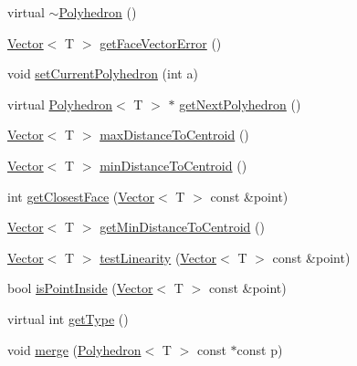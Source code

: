 \begin{DoxyCompactItemize}
\item 
virtual \hyperlink{classccmc_1_1_polyhedron_a0d70cc8f2c26b2fcc6589b66f00e3ab1}{$\sim$\-Polyhedron} ()
\item 
\hyperlink{classccmc_1_1_vector}{Vector}$<$ T $>$ \hyperlink{classccmc_1_1_polyhedron_a2c7464ff7c021b3b7aafaf3739217110}{get\-Face\-Vector\-Error} ()
\item 
void \hyperlink{classccmc_1_1_polyhedron_a140b9776d318b32baeb43f807f8b6791}{set\-Current\-Polyhedron} (int a)
\item 
virtual \hyperlink{classccmc_1_1_polyhedron}{Polyhedron}$<$ T $>$ $\ast$ \hyperlink{classccmc_1_1_polyhedron_a3a3d6e72e95b7e7829149f3fa59f57f6}{get\-Next\-Polyhedron} ()
\item 
\hyperlink{classccmc_1_1_vector}{Vector}$<$ T $>$ \hyperlink{classccmc_1_1_polyhedron_ac7c3d855a8df0072cc23c88a42f8bd78}{max\-Distance\-To\-Centroid} ()
\item 
\hyperlink{classccmc_1_1_vector}{Vector}$<$ T $>$ \hyperlink{classccmc_1_1_polyhedron_ac6c4696d8599d39da7dca7ecb6008ba7}{min\-Distance\-To\-Centroid} ()
\item 
int \hyperlink{classccmc_1_1_polyhedron_afd4793a541b3638e10ad230b9edc101c}{get\-Closest\-Face} (\hyperlink{classccmc_1_1_vector}{Vector}$<$ T $>$ const \&point)
\item 
\hyperlink{classccmc_1_1_vector}{Vector}$<$ T $>$ \hyperlink{classccmc_1_1_polyhedron_ab68fb11d2cbbd0a9bc81ce4c4a7279b1}{get\-Min\-Distance\-To\-Centroid} ()
\item 
\hyperlink{classccmc_1_1_vector}{Vector}$<$ T $>$ \hyperlink{classccmc_1_1_polyhedron_a4630616f4eb7d32a53e1a23a332db78c}{test\-Linearity} (\hyperlink{classccmc_1_1_vector}{Vector}$<$ T $>$ const \&point)
\item 
bool \hyperlink{classccmc_1_1_polyhedron_ab49d000c95f4e79132727103524ca45b}{is\-Point\-Inside} (\hyperlink{classccmc_1_1_vector}{Vector}$<$ T $>$ const \&point)
\item 
virtual int \hyperlink{classccmc_1_1_polyhedron_abef63d69bf96e4bacb000546631a048e}{get\-Type} ()
\item 
void \hyperlink{classccmc_1_1_polyhedron_a01b4863ead9a3136aec465067132afcc}{merge} (\hyperlink{classccmc_1_1_polyhedron}{Polyhedron}$<$ T $>$ const $\ast$const p)
\end{DoxyCompactItemize}
